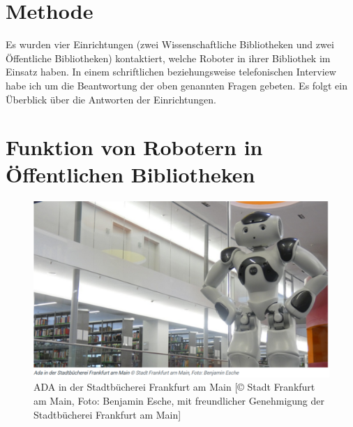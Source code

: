 \documentclass[a4paper,
fontsize=11pt,
oneside,
numbers=noperiodatend,
parskip=half-,
bibliography=totoc,
final
]{scrartcl}
\begin{document}
\hypertarget{methode}{%
\section{Methode}\label{methode}}

Es wurden vier Einrichtungen (zwei Wissenschaftliche Bibliotheken und
zwei Öffentliche Bibliotheken) kontaktiert, welche Roboter in ihrer
Bibliothek im Einsatz haben. In einem schriftlichen beziehungsweise
telefonischen Interview habe ich um die Beantwortung der oben genannten
Fragen gebeten. Es folgt ein Überblick über die Antworten der
Einrichtungen.

\hypertarget{funktion-von-robotern-in-uxf6ffentlichen-bibliotheken}{%
\section{Funktion von Robotern in Öffentlichen
Bibliotheken}\label{funktion-von-robotern-in-uxf6ffentlichen-bibliotheken}}

\begin{figure}
\centering
\includegraphics[width=.7\textwidth]{img/ADA.PNG}
\caption{ADA in der Stadtbücherei Frankfurt am Main {[}© Stadt Frankfurt am Main, Foto: Benjamin Esche, mit freundlicher Genehmigung der Stadtbücherei Frankfurt am Main{]}}
\end{figure}
\end{document}
